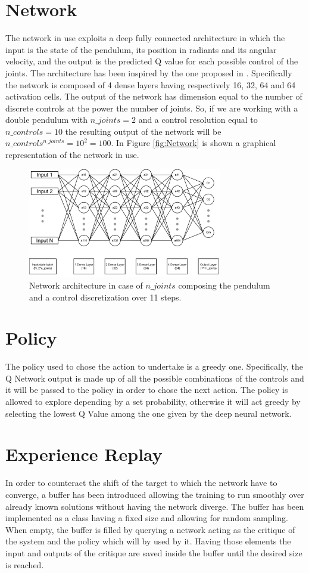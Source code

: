 \documentclass[twocolumn, a4paper]{article}
\begin{document}
\section{Network}
The network in use exploits a deep fully connected
architecture in which the input is the state of the pendulum, its position in
radiants and its angular velocity, and the output is the predicted Q value for
each possible control of the joints.
The architecture has been inspired by the one proposed in \cite{Mnih}.
Specifically the network is composed of 4 dense layers having respectively 16,
32, 64 and 64 activation cells. The output of the network has dimension equal
to the number of discrete controls at the power the number of joints.
So, if we are working with a double pendulum with $n\_joints=2$ and a control
resolution equal to $n\_controls=10$ the resulting output of the network will
be $n\_controls^{n\_joints}=10^2=100$.
In Figure \ref{fig:Network} is shown a graphical representation of the network
in use.

\label{fig:Network}
\begin{figure}
	\centering
	\includegraphics[width=8.5cm]{"../Figures/Network_schema"}
	\caption{Network architecture in case of $n\_joints$ composing the pendulum
			 and a control discretization over 11 steps.}
\end{figure}

\section{Policy}
The policy used to chose the action to undertake is a greedy one. Specifically,
the Q Network output is made up of all the possible combinations of the
controls and it will be passed to the policy in order to chose the next action.
The policy is allowed to explore depending by a set probability, otherwise it
will act greedy by selecting the lowest Q Value among the one given by the
deep neural network.

\section{Experience Replay}
In order to counteract the shift of the target to which the network have to
converge, a buffer has been introduced allowing the training to run smoothly
over already known solutions without having the network diverge.
The buffer has been implemented as a class having a fixed size and allowing for
random sampling. When empty, the buffer is filled by querying a network acting
as the critique of the system and the policy which will by used by it. Having
those elements the input and outputs of the critique are saved inside the
buffer until the desired size is reached.
\end{document}
